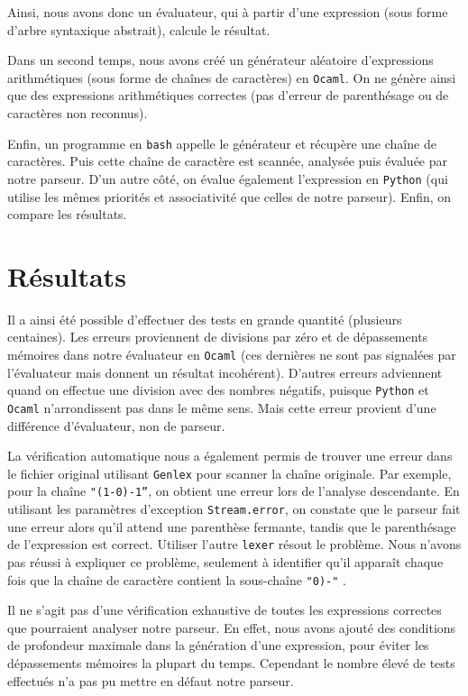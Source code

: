 \documentclass[11pt]{article}
\begin{document}
Ainsi, nous avons donc un évaluateur, qui à partir d'une expression (sous forme d'arbre syntaxique abstrait), calcule le résultat.

Dans un second temps, nous avons créé un générateur aléatoire d'expressions arithmétiques (sous forme de chaînes de caractères) en \texttt{Ocaml}. On ne génère ainsi que des expressions arithmétiques correctes (pas d'erreur de parenthésage ou de caractères non reconnus).




Enfin, un programme en \texttt{bash} appelle le générateur et récupère une chaîne de caractères. Puis cette chaîne de caractère est scannée, analysée puis évaluée par notre parseur. D'un autre côté, on évalue également l'expression en \texttt{Python} (qui utilise les mêmes priorités et associativité que celles de notre parseur). Enfin, on compare les résultats.

\section{Résultats}

Il a ainsi été possible d'effectuer des tests en grande quantité (plusieurs centaines).
Les erreurs proviennent de divisions par zéro et de dépassements mémoires dans notre évaluateur en \texttt{Ocaml} (ces dernières ne sont pas signalées par l'évaluateur mais donnent un résultat incohérent). D'autres erreurs adviennent quand on effectue une division avec des nombres négatifs, puisque \texttt{Python} et \texttt{Ocaml} n'arrondissent pas dans le même sens. Mais cette erreur provient d'une différence d'évaluateur, non de parseur.

La vérification automatique nous a également permis de trouver une erreur dans le fichier original utilisant \texttt{Genlex} pour scanner la chaîne originale. Par exemple, pour la chaîne \texttt{"(1-0)-1''}, on obtient une erreur lors de l'analyse descendante. En utilisant les paramètres d'exception \texttt{Stream.error}, on constate que le parseur fait une erreur alors qu'il attend une parenthèse fermante, tandis que le parenthésage de l'expression est correct. Utiliser l'autre \texttt{lexer} résout le problème. Nous n'avons pas réussi à expliquer ce problème, seulement à identifier qu'il apparaît chaque fois que la chaîne de caractère contient la sous-chaîne \texttt{"0)-"} .


Il ne s'agit pas d'une vérification exhaustive de toutes les expressions correctes que pourraient analyser notre parseur. En effet, nous avons ajouté des conditions de profondeur maximale dans la génération d'une expression, pour éviter les dépassements mémoires la plupart du temps. Cependant le nombre élevé de tests effectués n'a pas pu mettre en défaut notre parseur. 
\end{document}
